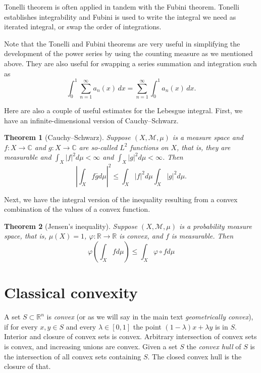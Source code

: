 \documentclass[12pt,openany]{book}
\newcommand{\sabs}[1]{\lvert {#1} \rvert}
\newcommand{\abs}[1]{\left\lvert {#1} \right\rvert}
\newcommand{\C}{{\mathbb{C}}}
\newcommand{\R}{{\mathbb{R}}}
\newcommand{\sM}{{\mathscr{M}}}
\newcommand{\myindex}[1]{#1\index{#1}}
\theoremstyle{plain}
\newtheorem{thm}{Theorem}[section]
\theoremstyle{remark}
\theoremstyle{definition}
\theoremstyle{exercise}
\theoremstyle{example}
\begin{document}
Tonelli theorem is often applied in tandem with the Fubini theorem.  Tonelli
establishes integrability and Fubini is used to write the integral we need
as iterated integral, or swap the order of integrations.

Note that the Tonelli and Fubini theorems are very useful in simplifying the
development of the power series by using the counting measure as we
mentioned above.  They are also useful for swapping a series summation and
integration such as
\begin{equation*}
\int_0^1 \sum_{n=1}^\infty a_n(x) \, dx
=
\sum_{n=1}^\infty \int_0^1 a_n(x) \, dx .
\end{equation*}

\pagebreak[2]
Here are also a couple of useful estimates for the Lebesgue integral.
First, we have an infinite-dimensional version of Cauchy--Schwarz.

\begin{thm}[Cauchy--Schwarz]
Suppose $(X,\sM,\mu)$ is a measure space and $f \colon X \to \C$ and
$g \colon X \to \C$
are so-called $L^2$ functions on $X$, that is,
they are measurable and
$\int_X \sabs{f}^2 d\mu < \infty$ and
$\int_X \sabs{g}^2 d\mu < \infty$.  Then
\begin{equation*}
\abs{
\int_X f \bar{g} d\mu
}^2
\leq
\int_X \sabs{f}^2 d\mu
\int_X \sabs{g}^2 d\mu .
\end{equation*}
\end{thm}

Next, we have the integral version of the inequality
resulting from a convex combination of the values of a convex function.

\begin{thm}[Jensen's inequality]
Suppose $(X,\sM,\mu)$ is a probability measure space, that is, $\mu(X)=1$,
$\varphi \colon \R \to \R$ is convex, and $f$ is measurable.  Then
\begin{equation*}
\varphi \left(
\int_X f d\mu
\right)
\leq
\int_X \varphi \circ f d\mu
\end{equation*}
\end{thm}


\section{Classical convexity} \label{apsec:convexity}

A set $S \subset \R^n$ is \emph{convex}
(or as we will say in the main text
\emph{\myindex{geometrically convex}}),
if for every $x,y \in S$ and every $\lambda \in [0,1]$ the
point $(1-\lambda) x + \lambda y$ is in $S$.
Interior and closure of convex sets is convex.
Arbitrary intersection of convex sets is convex, and increasing unions
are convex.  Given a set $S$ the \emph{\myindex{convex hull}} of $S$ is
the intersection of all convex sets containing $S$.  The closed convex hull
is the closure of that.
\end{document}
